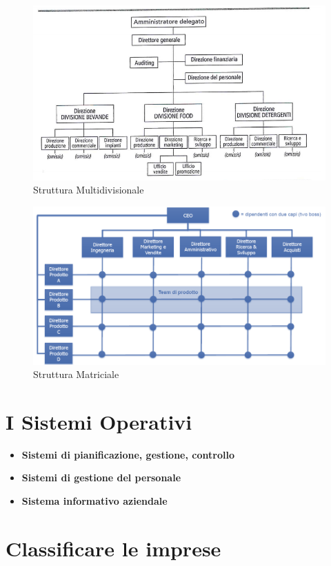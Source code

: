 \documentclass[12pt]{article}
\begin{document}
\begin{figure}[!htb]
    \centering
    \includegraphics[width=1\textwidth]{images/multidivisionale.png}
    \caption{Struttura Multidivisionale}
\end{figure}
\FloatBarrier
\begin{figure}[!htb]
    \centering
    \includegraphics[width=1\textwidth]{images/matriciale.png}
    \caption{Struttura Matriciale}
\end{figure}
\FloatBarrier
\section{I Sistemi Operativi}
\begin{itemize}
    \item \textbf{Sistemi di pianificazione, gestione, controllo}
    \item \textbf{Sistemi di gestione del personale}
    \item \textbf{Sistema informativo aziendale}
\end{itemize}
\newpage
\section{Classificare le imprese}
\end{document}
